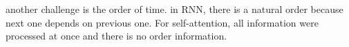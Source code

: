 another challenge is the order of time. in RNN, there is a natural order because next one depends on previous one. For self-attention, all information were processed at once and there is no order information. 
















































































































